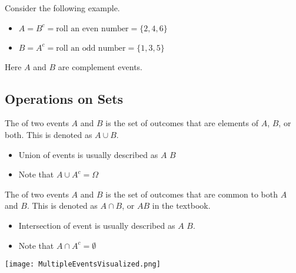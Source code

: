 \begin{example}
    Consider the following example. 

    \begin{itemize}
        \item $A = B^c = \text{roll an even  number} = \{ 2, 4, 6 \}$
        \item $B = A^c = \text{roll an odd number} = \{ 1, 3, 5 \}$
    \end{itemize}

    Here $A$ and $B$ are complement events.
\end{example}

\subsection{Operations on Sets}

\begin{definition}[Union]
    The  of two events $A$ and $B$ is the set of outcomes that are elements of $A$, $B$, or both. This is denoted as $A \cup B$.

    \begin{itemize}
        \item Union of events is usually described as $A$  $B$
        \item Note that $A \cup A^c = \Omega$
    \end{itemize}
\end{definition}


\begin{definition}[Intersection]
    The  of two events $A$ and $B$ is the set of outcomes that are common to both $A$ and $B$. This is denoted as $A \cap B$, or $AB$ in the textbook.

    \begin{itemize}
        \item Intersection of event is usually described as $A$  $B$. 
        \item Note that $A \cap A^c = \emptyset$
    \end{itemize}
\end{definition}

\begin{center}
    \texttt{[image: MultipleEventsVisualized.png]}
\end{center}

